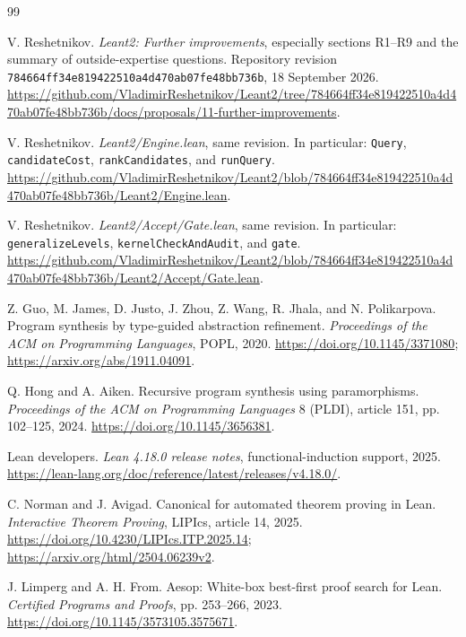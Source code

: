 \documentclass[11pt,a4paper]{article}
\newcommand{\code}[1]{\nolinkurl{#1}}
\theoremstyle{remark}
\begin{document}
\begin{thebibliography}{99}
\small
\setlength{\itemsep}{2pt}
\setlength{\parsep}{0pt}
\setlength{\parskip}{0pt}

 V. Reshetnikov.
\emph{Leant2: Further improvements}, especially sections R1--R9 and the summary of outside-expertise questions.
Repository revision \texttt{784664ff34e819422510a4d470ab07fe48bb736b}, 18 September 2026.
\url{https://github.com/VladimirReshetnikov/Leant2/tree/784664ff34e819422510a4d470ab07fe48bb736b/docs/proposals/11-further-improvements}.

 V. Reshetnikov.
\emph{Leant2/Engine.lean}, same revision. In particular: \code{Query}, \code{candidateCost}, \code{rankCandidates}, and \code{runQuery}.
\url{https://github.com/VladimirReshetnikov/Leant2/blob/784664ff34e819422510a4d470ab07fe48bb736b/Leant2/Engine.lean}.

 V. Reshetnikov.
\emph{Leant2/Accept/Gate.lean}, same revision. In particular: \code{generalizeLevels}, \code{kernelCheckAndAudit}, and \code{gate}.
\url{https://github.com/VladimirReshetnikov/Leant2/blob/784664ff34e819422510a4d470ab07fe48bb736b/Leant2/Accept/Gate.lean}.

 Z. Guo, M. James, D. Justo, J. Zhou, Z. Wang, R. Jhala, and N. Polikarpova.
Program synthesis by type-guided abstraction refinement.
\emph{Proceedings of the ACM on Programming Languages}, POPL, 2020.
\url{https://doi.org/10.1145/3371080};
\url{https://arxiv.org/abs/1911.04091}.

 Q. Hong and A. Aiken.
Recursive program synthesis using paramorphisms.
\emph{Proceedings of the ACM on Programming Languages} 8 (PLDI), article 151, pp. 102--125, 2024.
\url{https://doi.org/10.1145/3656381}.

 Lean developers.
\emph{Lean 4.18.0 release notes}, functional-induction support, 2025.
\url{https://lean-lang.org/doc/reference/latest/releases/v4.18.0/}.

 C. Norman and J. Avigad.
Canonical for automated theorem proving in Lean.
\emph{Interactive Theorem Proving}, LIPIcs, article 14, 2025.
\url{https://doi.org/10.4230/LIPIcs.ITP.2025.14};
\url{https://arxiv.org/html/2504.06239v2}.

 J. Limperg and A. H. From.
Aesop: White-box best-first proof search for Lean.
\emph{Certified Programs and Proofs}, pp. 253--266, 2023.
\url{https://doi.org/10.1145/3573105.3575671}.


\end{thebibliography}
\end{document}
